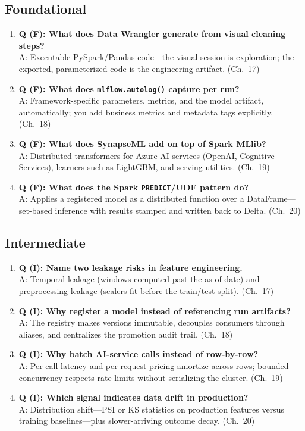 \subsection*{Foundational}
\begin{enumerate}
    \item \textbf{Q (F): What does Data Wrangler generate from visual cleaning steps?}\\
    A: Executable PySpark/Pandas code---the visual session is exploration; the exported,
    parameterized code is the engineering artifact. (Ch.~17)
    \item \textbf{Q (F): What does \texttt{mlflow.autolog()} capture per run?}\\
    A: Framework-specific parameters, metrics, and the model artifact, automatically; you add
    business metrics and metadata tags explicitly. (Ch.~18)
    \item \textbf{Q (F): What does SynapseML add on top of Spark MLlib?}\\
    A: Distributed transformers for Azure AI services (OpenAI, Cognitive Services), learners
    such as LightGBM, and serving utilities. (Ch.~19)
    \item \textbf{Q (F): What does the Spark \texttt{PREDICT}/UDF pattern do?}\\
    A: Applies a registered model as a distributed function over a DataFrame---set-based
    inference with results stamped and written back to Delta. (Ch.~20)
\end{enumerate}

\subsection*{Intermediate}
\begin{enumerate}
    \item \textbf{Q (I): Name two leakage risks in feature engineering.}\\
    A: Temporal leakage (windows computed past the as-of date) and preprocessing leakage
    (scalers fit before the train/test split). (Ch.~17)
    \item \textbf{Q (I): Why register a model instead of referencing run artifacts?}\\
    A: The registry makes versions immutable, decouples consumers through aliases, and
    centralizes the promotion audit trail. (Ch.~18)
    \item \textbf{Q (I): Why batch AI-service calls instead of row-by-row?}\\
    A: Per-call latency and per-request pricing amortize across rows; bounded concurrency
    respects rate limits without serializing the cluster. (Ch.~19)
    \item \textbf{Q (I): Which signal indicates data drift in production?}\\
    A: Distribution shift---PSI or KS statistics on production features versus training
    baselines---plus slower-arriving outcome decay. (Ch.~20)
\end{enumerate}

